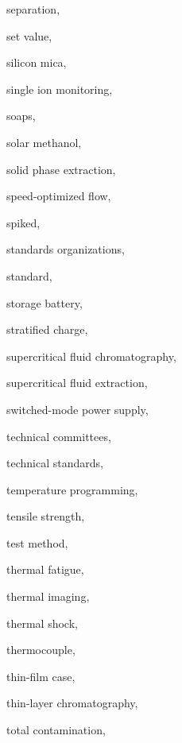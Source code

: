 \begin{theindex}
  \item \lowercase {separation}, 
  \item \lowercase {set value}, 
  \item \lowercase {silicon mica}, 
  \item \lowercase {single ion monitoring}, 
  \item \lowercase {soaps}, 
  \item \lowercase {solar methanol}, 
  \item \lowercase {solid phase extraction}, 
  \item \lowercase {speed-optimized flow}, 
  \item \lowercase {spiked}, 
  \item \lowercase {standards organizations}, 
  \item \lowercase {standard}, 
  \item \lowercase {storage battery}, 
  \item \lowercase {stratified charge}, 
  \item \lowercase {supercritical fluid chromatography}, 
  \item \lowercase {supercritical fluid extraction}, 
  \item \lowercase {switched-mode power supply}, 
  \item \lowercase {technical committees}, 
  \item \lowercase {technical standards}, 
  \item \lowercase {temperature programming}, 
  \item \lowercase {tensile strength}, 
  \item \lowercase {test method}, 
  \item \lowercase {thermal fatigue}, 
  \item \lowercase {thermal imaging}, 
  \item \lowercase {thermal shock}, 
  \item \lowercase {thermocouple}, 
  \item \lowercase {thin-film case}, 
  \item \lowercase {thin-layer chromatography}, 
  \item \lowercase {total contamination}, 

\end{theindex}

